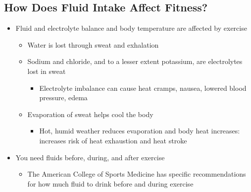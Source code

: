 \documentclass[12pt]{article}
\begin{document}
        \subsection{How Does Fluid Intake Affect Fitness?}
            \begin{itemize}
                \item Fluid and electrolyte balance and body temperature are affected by exercise
                    \begin{itemize}
                        \item Water is lost through sweat and exhalation
                        \item Sodium and chloride, and to a lesser extent potassium, are electrolytes lost in sweat
                            \begin{itemize}
                                \item Electrolyte imbalance can cause heat cramps, nausea, lowered blood pressure, edema
                            \end{itemize}
                        \item Evaporation of sweat helps cool the body
                            \begin{itemize}
                                \item Hot, humid weather reduces evaporation and body heat increases: increases risk of heat exhaustion and heat stroke
                            \end{itemize}
                    \end{itemize}
                \item You need fluids before, during, and after exercise
                    \begin{itemize}
                        \item The American College of Sports Medicine has specific recommendations for how much fluid to drink before and during exercise
                    \end{itemize}
            \end{itemize}
\end{document}
